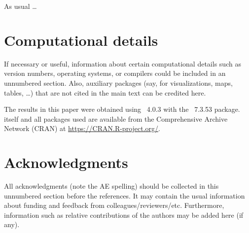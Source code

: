 \documentclass[article]{jss}
\begin{document}
\begin{leftbar}
As usual \dots
\end{leftbar}



\section*{Computational details}

\begin{leftbar}
If necessary or useful, information about certain computational details
such as version numbers, operating systems, or compilers could be included
in an unnumbered section. Also, auxiliary packages (say, for visualizations,
maps, tables, \dots) that are not cited in the main text can be credited here.
\end{leftbar}

The results in this paper were obtained using
~4.0.3 with the
~7.3.53 package.  itself
and all packages used are available from the Comprehensive
 Archive Network (CRAN) at
\url{https://CRAN.R-project.org/}.


\section*{Acknowledgments}

\begin{leftbar}
All acknowledgments (note the AE spelling) should be collected in this
unnumbered section before the references. It may contain the usual information
about funding and feedback from colleagues/reviewers/etc. Furthermore,
information such as relative contributions of the authors may be added here
(if any).
\end{leftbar}






\end{document}
